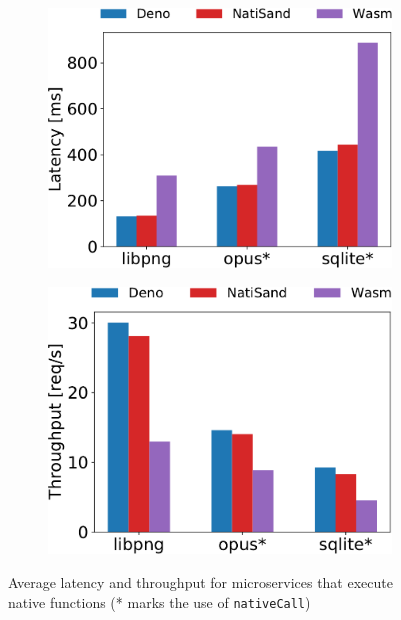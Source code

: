 \begin{figure}[t!]
	\begin{subfigure}{0.47\columnwidth}
		\includegraphics[width=\columnwidth]{chapters/natisand/fig/cropped-summary-ffi-latency.pdf}
	\end{subfigure}%
	\hspace{1em}
	\begin{subfigure}{0.47\columnwidth}
		\includegraphics[width=\columnwidth]{chapters/natisand/fig/cropped-summary-ffi-throughput.pdf}
	\end{subfigure}
	\caption[Average latency and throughput of native-functions-based
		microservices]{
		Average latency and throughput for microservices that execute
		native functions (* marks the use of {\tt nativeCall})
	}
	\label{fig:native-lib-latecy-throughput}
\end{figure}

